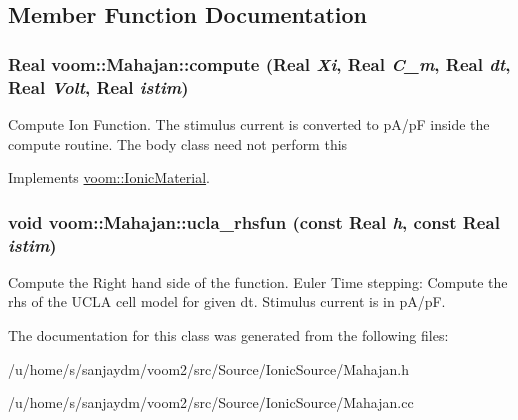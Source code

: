 \subsection{Member Function Documentation}
\hypertarget{classvoom_1_1_mahajan_af69275575333c5b53c6485b090f77041}{
\subsubsection[{compute}]{\setlength{\rightskip}{0pt plus 5cm}Real voom::Mahajan::compute (Real {\em Xi}, \/  Real {\em C\_\-m}, \/  Real {\em dt}, \/  Real {\em Volt}, \/  Real {\em istim})}}
\label{classvoom_1_1_mahajan_af69275575333c5b53c6485b090f77041}
Compute Ion Function. The stimulus current is converted to pA/pF inside the compute routine. The body class need not perform this 

Implements \hyperlink{classvoom_1_1_ionic_material_a1b95cf90af115374b428f2e5ece571cb}{voom::IonicMaterial}.\hypertarget{classvoom_1_1_mahajan_a823f525969c509dc65b22f1f88efe173}{
\subsubsection[{ucla\_\-rhsfun}]{\setlength{\rightskip}{0pt plus 5cm}void voom::Mahajan::ucla\_\-rhsfun (const Real {\em h}, \/  const Real {\em istim})}}
\label{classvoom_1_1_mahajan_a823f525969c509dc65b22f1f88efe173}


Compute the Right hand side of the function. Euler Time stepping: Compute the rhs of the UCLA cell model for given dt. Stimulus current is in pA/pF. 

The documentation for this class was generated from the following files:\begin{DoxyCompactItemize}
\item 
/u/home/s/sanjaydm/voom2/src/Source/IonicSource/Mahajan.h\item 
/u/home/s/sanjaydm/voom2/src/Source/IonicSource/Mahajan.cc\end{DoxyCompactItemize}
